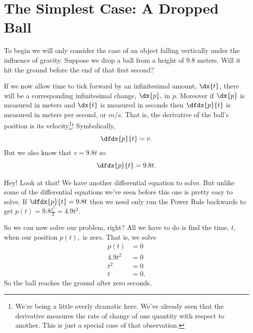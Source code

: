 


\section{The Simplest Case: A Dropped Ball}
\label{sec:simpl-case:-dropp}

To begin we will only consider the case of an object falling
vertically under the influence of gravity.  Suppose we drop a ball
from a height of $9.8$ meters. Will it hit the ground before the end
of that first second?




If we now allow time to tick forward by an infinitesimal amount,
$\dx{t}$, there will be a corresponding infinitesimal change, $\dx{p},$
in $p$. Moreover if $\dx{p}$ is measured in meters and $\dx{t}$ is
measured in seconds then $\dfdx{p}{t}$ is measured in meters per
second, or $m/s.$ That is, the derivative of the ball's position is
its velocity\footnote{We're being a little overly dramatic here. We've
  already seen that the derivative measures the rate of change of one
  quantity with respect to another. This is just a special case of
  that observation.}! Symbolically,
$$
\dfdx{p}{t}=v.
$$
But we also know that $v=9.8t$ so
$$
\dfdx{p}{t}=9.8t.
$$

Hey! Look at that! We have another differential equation to solve. But
unlike some of the differential equations we've seen before this one
is pretty easy to solve. If $\dfdx{p}{t}=9.8t$ then we need only run
the Power Rule backwards to get $p(t) = 9.8\frac{t^2}{2}=4.9t^2$.


So we can now solve our problem, right? All we have to do is find the
time, $t,$ when our position $p(t),$ is zero. That is, we solve
\begin{align*}
  p(t)&=0\\
  4.9t^2&=0\\
  t^2&=0\\
  t&=0.
\end{align*}
So the ball reaches the ground after zero seconds.

